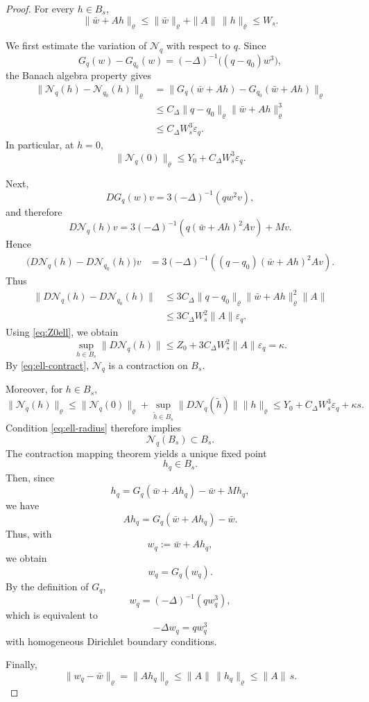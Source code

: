 \documentclass[11pt,a4paper]{amsart}
\begin{document}
\begin{proof}
	For every $h\in B_s$,
	\[
	\|\bar w+Ah\|_\varrho
	\le
	\|\bar w\|_\varrho+\|A\|\,\|h\|_\varrho
	\le
	W_s.
	\]
	
	We first estimate the variation of $\mathcal N_q$ with respect to
	$q$. Since
	\[
	G_q(w)-G_{q_0}(w)
	=
	(-\Delta)^{-1}\bigl((q-q_0)w^3\bigr),
	\]
	the Banach algebra property gives
	\[
	\begin{aligned}
		\|
		\mathcal N_q(h)-\mathcal N_{q_0}(h)
		\|_\varrho
		&=
		\|
		G_q(\bar w+Ah)-G_{q_0}(\bar w+Ah)
		\|_\varrho
		\\
		&\le
		C_\Delta
		\|q-q_0\|_\varrho
		\|\bar w+Ah\|_\varrho^3
		\\
		&\le
		C_\Delta W_s^3\varepsilon_q.
	\end{aligned}
	\]
	In particular, at $h=0$,
	\begin{equation}\label{eq:Nq0bound}
		\|\mathcal N_q(0)\|_\varrho
		\le
		Y_0+C_\Delta W_s^3\varepsilon_q.
	\end{equation}
	
	Next,
	\[
	DG_q(w)v
	=
	3(-\Delta)^{-1}(qw^2v),
	\]
	and therefore
	\[
	D\mathcal N_q(h)v
	=
	3(-\Delta)^{-1}
	\left(
	q(\bar w+Ah)^2Av
	\right)
	+
	Mv.
	\]
	Hence
	\[
	\begin{aligned}
		\bigl(
		D\mathcal N_q(h)
		-
		D\mathcal N_{q_0}(h)
		\bigr)v
		&=
		3(-\Delta)^{-1}
		\left(
		(q-q_0)(\bar w+Ah)^2Av
		\right).
	\end{aligned}
	\]
	Thus
	\[
	\begin{aligned}
		\|
		D\mathcal N_q(h)
		-
		D\mathcal N_{q_0}(h)
		\|
		&\le
		3C_\Delta
		\|q-q_0\|_\varrho
		\|\bar w+Ah\|_\varrho^2
		\|A\|
		\\
		&\le
		3C_\Delta W_s^2\|A\|\varepsilon_q.
	\end{aligned}
	\]
	Using \eqref{eq:Z0ell}, we obtain
	\[
	\sup_{h\in B_s}
	\|D\mathcal N_q(h)\|
	\le
	Z_0
	+
	3C_\Delta W_s^2\|A\|\varepsilon_q
	=
	\kappa.
	\]
	By \eqref{eq:ell-contract}, $\mathcal N_q$ is a contraction on
	$B_s$.
	
	Moreover, for $h\in B_s$,
$$		\|\mathcal N_q(h)\|_\varrho
		\le
		\|\mathcal N_q(0)\|_\varrho
		+
		\sup_{\widetilde h\in B_s}
		\|D\mathcal N_q(\widetilde h)\|
		\|h\|_\varrho\le
		Y_0+C_\Delta W_s^3\varepsilon_q+\kappa s.
$$
	Condition \eqref{eq:ell-radius} therefore implies
	\[
	\mathcal N_q(B_s)\subset B_s.
	\]
	The contraction mapping theorem yields a unique fixed point
	\[
	h_q\in B_s.
	\]	
	Then, since
	\[
	h_q
	=
	G_q(\bar w+Ah_q)-\bar w+Mh_q,
	\]
	we have
	\[
	Ah_q
	=
	G_q(\bar w+Ah_q)-\bar w.
	\]
	Thus, with
	\[
	w_q:=\bar w+Ah_q,
	\]
	we obtain
	\[
	w_q=G_q(w_q).
	\]
	By the definition of $G_q$,
	\[
	w_q=(-\Delta)^{-1}(q w_q^3),
	\]
	which is equivalent to
	\[
	-\Delta w_q=q w_q^3
	\]
	with homogeneous Dirichlet boundary conditions.
	
	Finally,
	\[
	\|w_q-\bar w\|_\varrho
	=
	\|Ah_q\|_\varrho
	\le
	\|A\|\,\|h_q\|_\varrho
	\le
	\|A\|\,s.
	\]
\end{proof}
\end{document}
